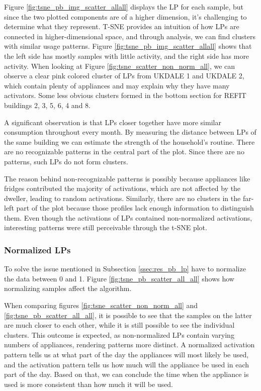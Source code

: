 Figure \ref{fig:tsne_pb_img_scatter_allall} displays the LP for each sample, but since the two plotted components are of a higher dimension, it's challenging to determine what they represent. 
T-SNE provides an intuition of how LPs are connected in higher-dimensional space, and through analysis, we can find clusters with similar usage patterns.
Figure \ref{fig:tsne_pb_img_scatter_allall} shows that the left side has mostly samples with little activity, and the right side has more activity.
When looking at Figure \ref{fig:tsne_scatter_non_norm_all}, we can observe a clear pink colored cluster of LPs from UKDALE 1 and UKDALE 2, which contain plenty of appliances and may explain why they have many activators.
Some less obvious clusters formed in the bottom section for REFIT buildings 2, 3, 5, 6, 4 and 8. 

A significant observation is that LPs closer together have more similar consumption throughout every month.
By measuring the distance between LPs of the same building we can estimate the strength of the household's routine. 
There are no recognizable patterns in the central part of the plot. 
Since there are no patterns, such LPs do not form clusters. 

The reason behind non-recognizable patterns is possibly because appliances like fridges contributed the majority of activations, which are not affected by the dweller, leading to random activations.
Similarly, there are no clusters in the far-left part of the plot because those profiles lack enough information to distinguish them. 
Even though the activations of LPs contained non-normalized activations, interesting patterns were still perceivable through the t-SNE plot.

\subsubsection{Normalized LPs}

To solve the issue mentioned in Subsection \ref{ssec:res_pb_lp} have to normalize the data between 0 and 1.
Figure \ref{fig:tsne_pb_scatter_all_all} shows how normalizing samples affect the algorithm.

When comparing figures \ref{fig:tsne_scatter_non_norm_all} and \ref{fig:tsne_pb_scatter_all_all},
it is possible to see that the samples on the latter are much closer to each other,
while it is still possible to see the individual clusters.
This outcome is expected, as non-normalized LPs contain varying numbers of appliances, rendering patterns more distinct.
A normalized activation pattern tells us at what part of the day the appliances will most likely be used,
and the activation pattern tells us how much will the appliance be used in each part of the day.
Based on that, we can conclude the time when the appliance is used is more consistent than how much it will be used. 



